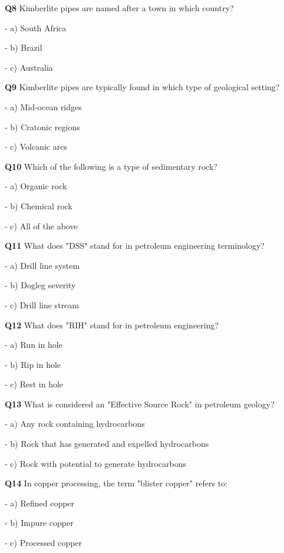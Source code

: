 \textbf{Q8} Kimberlite pipes are named after a town in which country?\par
\quad - a) South Africa\par
\quad - b) Brazil\par
\quad - c) Australia\par

\textbf{Q9} Kimberlite pipes are typically found in which type of geological setting?\par
\quad - a) Mid‑ocean ridges\par
\quad - b) Cratonic regions\par
\quad - c) Volcanic arcs\par

\textbf{Q10} Which of the following is a type of sedimentary rock?\par
\quad - a) Organic rock\par
\quad - b) Chemical rock\par
\quad - c) All of the above\par

\textbf{Q11} What does "DSS" stand for in petroleum engineering terminology?\par
\quad - a) Drill line system\par
\quad - b) Dogleg severity\par
\quad - c) Drill line stream\par

\textbf{Q12} What does "RIH" stand for in petroleum engineering?\par
\quad - a) Run in hole\par
\quad - b) Rip in hole\par
\quad - c) Rest in hole\par

\textbf{Q13} What is considered an "Effective Source Rock" in petroleum geology?\par
\quad - a) Any rock containing hydrocarbons\par
\quad - b) Rock that has generated and expelled hydrocarbons\par
\quad - c) Rock with potential to generate hydrocarbons\par

\textbf{Q14} In copper processing, the term "blister copper" refers to:\par
\quad - a) Refined copper\par
\quad - b) Impure copper\par
\quad - c) Processed copper\par

